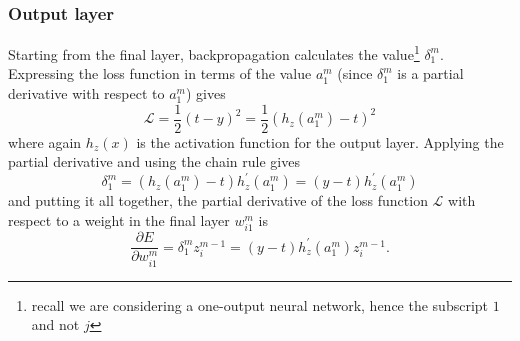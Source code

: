 \documentclass[../main.tex]{subfiles}
\begin{document}
\subsubsection{Output layer}
Starting from the final layer, backpropagation calculates the
value\footnote{recall we are considering a one-output neural network, hence the
subscript $1$ and not $j$} $\delta_{1}^{m}$.
%
Expressing the loss function in terms of the value $a_{1}^{m}$ (since
$\delta_{1}^{m}$ is a partial derivative with respect to $a_{1}^{m}$) gives
%
\begin{equation}
  \mathcal{L} = \frac{1}{2} {(t - y)}^{2} = \frac{1}{2} {\left(h_{z}(a_{1}^{m})
    - t\right)}^{2} 
\end{equation}
%
where again $h_{z}(x)$ is the activation function for the output layer.
%
Applying the partial derivative and using the chain rule gives
%
\begin{equation}
  \delta_{1}^{m} = {\left(h_{z}(a_{1}^{m}) - t\right)}
    h_{z}^{\prime}(a_{1}^{m}) = (y - t) h_{z}^{\prime}(a_{1}^{m})
\end{equation}
%
and putting it all together, the partial derivative of the loss function
$\mathcal{L}$ with respect to a weight in the final layer $w_{i1}^{m}$ is
%
\begin{equation}
  \frac{\partial E}{\partial w_{i1}^{m}} = \delta_{1}^{m} z_{i}^{m-1} = (y - t)
    h_{z}^{\prime}(a_{1}^{m}) z_{i}^{m-1}.
\label{eq:output_layer}
\end{equation}
\end{document}
